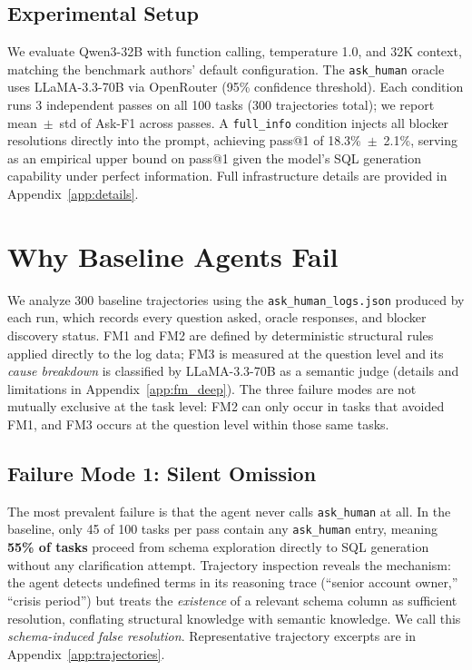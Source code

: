 \documentclass{article} %
\newcommand{\askhuman}{\texttt{ask\_human}}
\begin{document}
\subsection{Experimental Setup}
\label{sec:setup}

We evaluate Qwen3-32B \citep{qwen3} with function calling, temperature 1.0, and 32K
context, matching the benchmark authors' default configuration.
The \askhuman{} oracle uses LLaMA-3.3-70B via OpenRouter (95\% confidence threshold).
Each condition runs 3 independent passes on all 100 tasks (300 trajectories total);
we report mean~$\pm$~std of Ask-F1 across passes.
A \texttt{full\_info} condition injects all blocker resolutions directly into the prompt,
achieving pass@1 of 18.3\%~$\pm$~2.1\%, serving as an empirical upper bound on
pass@1 given the model's SQL generation capability under perfect information.
Full infrastructure details are provided in Appendix~\ref{app:details}.

\section{Why Baseline Agents Fail}
\label{sec:failure}

We analyze 300 baseline trajectories using the \texttt{ask\_human\_logs.json} produced
by each run, which records every question asked, oracle responses, and blocker discovery
status.
FM1 and FM2 are defined by deterministic structural rules applied directly to the log
data; FM3 is measured at the question level and its \emph{cause breakdown} is classified
by LLaMA-3.3-70B as a semantic judge (details and limitations in
Appendix~\ref{app:fm_deep}).
The three failure modes are not mutually exclusive at the task level: FM2 can only occur
in tasks that avoided FM1, and FM3 occurs at the question level within those same tasks.

\subsection{Failure Mode 1: Silent Omission}

The most prevalent failure is that the agent never calls \askhuman{} at all.
In the baseline, only 45 of 100 tasks per pass contain any \askhuman{} entry, meaning
\textbf{55\% of tasks} proceed from schema exploration directly to SQL generation without
any clarification attempt.
Trajectory inspection reveals the mechanism: the agent detects undefined terms in its
reasoning trace (``senior account owner,'' ``crisis period'') but treats the
\emph{existence} of a relevant schema column as sufficient resolution, conflating
structural knowledge with semantic knowledge.
We call this \emph{schema-induced false resolution}.
Representative trajectory excerpts are in Appendix~\ref{app:trajectories}.
\end{document}
